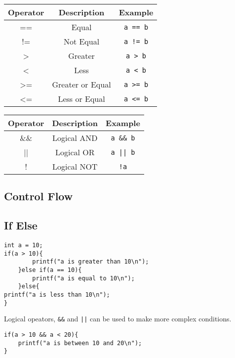\documentclass[a4paper, 10pt]{article}
\begin{document}
\vspace{1em}
\begin{minipage}{0.50\textwidth}
    \centering
    \begin{tabular}{|c|c|c|}
        \hline
        Operator & Description      & Example         \\
        \hline
        ==       & Equal            & \texttt{a == b} \\
        \hline
        !=       & Not Equal        & \texttt{a != b} \\
        \hline
        >        & Greater          & \texttt{a > b}  \\
        \hline
        <        & Less             & \texttt{a < b}  \\
        \hline
        >=       & Greater or Equal & \texttt{a >= b} \\
        \hline
        <=       & Less or Equal    & \texttt{a <= b} \\
        \hline
    \end{tabular}
\end{minipage}
\hfill
\begin{minipage}{0.45\textwidth}
    \centering
    \begin{tabular}{|c|c|c|}
        \hline
        Operator & Description & Example           \\
        \hline
        \&\&     & Logical AND & \texttt{a \&\& b} \\
        \hline
        ||       & Logical OR  & \texttt{a || b}   \\
        \hline
        !        & Logical NOT & \texttt{!a}       \\
        \hline
    \end{tabular}
\end{minipage}

\pagebreak

\subsection{Control Flow}

\subsection{If Else}
\begin{lstlisting}[style=cStyle, caption={If-Else}]
int a = 10;
if(a > 10){
        printf("a is greater than 10\n");
    }else if(a == 10){
        printf("a is equal to 10\n");
    }else{
printf("a is less than 10\n");
}
\end{lstlisting}
Logical opeators, \texttt{\&\&} and \texttt{||} can be used to make more complex conditions.
\begin{lstlisting}[style=cStyle, caption={Complex If-Else}]
if(a > 10 && a < 20){
    printf("a is between 10 and 20\n");
}
\end{lstlisting}
\end{document}
